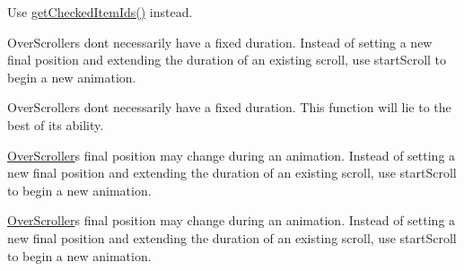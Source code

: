 
\begin{DoxyRefList}
\item[\label{deprecated__deprecated000001}%
\Hypertarget{deprecated__deprecated000001}%
Member \hyperlink{classit_1_1sephiroth_1_1android_1_1library_1_1widget_1_1_h_list_view_ad7b4d7aa2500eeea7ade9fcd1e6c31e7}{it.sephiroth.android.library.widget.H\+List\+View.get\+Check\+Item\+Ids} ()]Use \hyperlink{classit_1_1sephiroth_1_1android_1_1library_1_1widget_1_1_abs_h_list_view_a7a212bc367d2dc31f48e313e6f3ef9cf}{get\+Checked\+Item\+Ids()} instead.  
\item[\label{deprecated__deprecated000003}%
\Hypertarget{deprecated__deprecated000003}%
Member \hyperlink{classit_1_1sephiroth_1_1android_1_1library_1_1widget_1_1_over_scroller_a94c0a3042a747b6212859cc06bf749d5}{it.sephiroth.android.library.widget.Over\+Scroller.extend\+Duration} (int extend)]Over\+Scrollers don\textquotesingle{}t necessarily have a fixed duration. Instead of setting a new final position and extending the duration of an existing scroll, use start\+Scroll to begin a new animation.  
\item[\label{deprecated__deprecated000002}%
\Hypertarget{deprecated__deprecated000002}%
Member \hyperlink{classit_1_1sephiroth_1_1android_1_1library_1_1widget_1_1_over_scroller_a0e6a139bbc3eb72edce05e31e801636f}{it.sephiroth.android.library.widget.Over\+Scroller.get\+Duration} ()]Over\+Scrollers don\textquotesingle{}t necessarily have a fixed duration. This function will lie to the best of its ability.  
\item[\label{deprecated__deprecated000004}%
\Hypertarget{deprecated__deprecated000004}%
Member \hyperlink{classit_1_1sephiroth_1_1android_1_1library_1_1widget_1_1_over_scroller_a6cc75f4f959d10d938d62bbc2da639ed}{it.sephiroth.android.library.widget.Over\+Scroller.set\+FinalX} (int newX)]\hyperlink{classit_1_1sephiroth_1_1android_1_1library_1_1widget_1_1_over_scroller}{Over\+Scroller}\textquotesingle{}s final position may change during an animation. Instead of setting a new final position and extending the duration of an existing scroll, use start\+Scroll to begin a new animation.  
\item[\label{deprecated__deprecated000005}%
\Hypertarget{deprecated__deprecated000005}%
Member \hyperlink{classit_1_1sephiroth_1_1android_1_1library_1_1widget_1_1_over_scroller_a9ef2e1e21a97339f297abd812518828e}{it.sephiroth.android.library.widget.Over\+Scroller.set\+FinalY} (int newY)]\hyperlink{classit_1_1sephiroth_1_1android_1_1library_1_1widget_1_1_over_scroller}{Over\+Scroller}\textquotesingle{}s final position may change during an animation. Instead of setting a new final position and extending the duration of an existing scroll, use start\+Scroll to begin a new animation. 
\end{DoxyRefList}